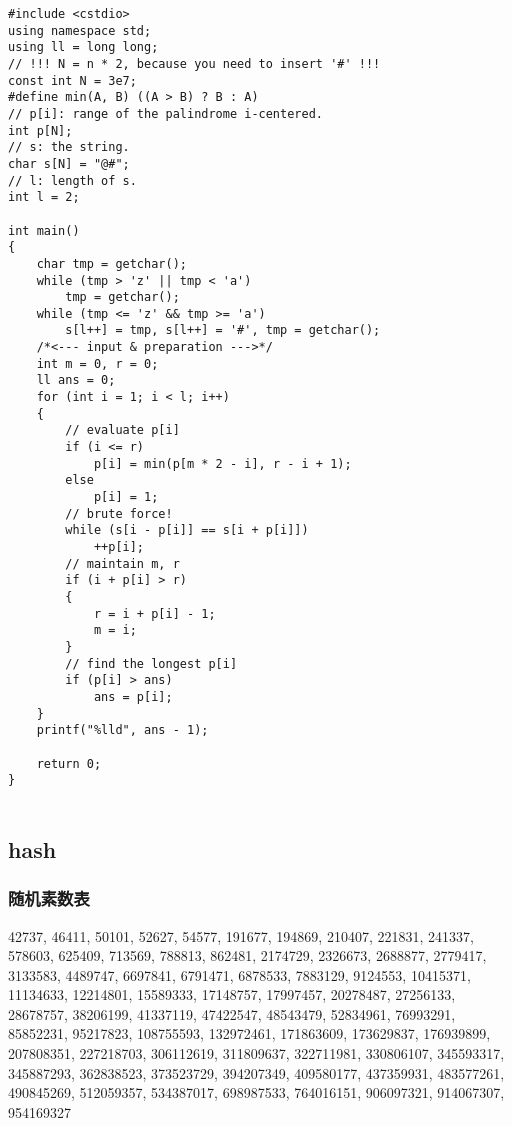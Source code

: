 \documentclass[]{article}
\begin{document}
\begin{verbatim}
#include <cstdio>
using namespace std;
using ll = long long;
// !!! N = n * 2, because you need to insert '#' !!!
const int N = 3e7;
#define min(A, B) ((A > B) ? B : A)
// p[i]: range of the palindrome i-centered. 
int p[N];
// s: the string.
char s[N] = "@#";
// l: length of s.
int l = 2;

int main()
{
    char tmp = getchar();
    while (tmp > 'z' || tmp < 'a')
        tmp = getchar();
    while (tmp <= 'z' && tmp >= 'a')
        s[l++] = tmp, s[l++] = '#', tmp = getchar();
    /*<--- input & preparation --->*/
    int m = 0, r = 0;
    ll ans = 0;
    for (int i = 1; i < l; i++)
    {
        // evaluate p[i]
        if (i <= r)
            p[i] = min(p[m * 2 - i], r - i + 1);
        else
            p[i] = 1;
        // brute force!
        while (s[i - p[i]] == s[i + p[i]])
            ++p[i];
        // maintain m, r
        if (i + p[i] > r)
        {
            r = i + p[i] - 1;
            m = i;
        }
        // find the longest p[i]
        if (p[i] > ans)
            ans = p[i]; 
    }
    printf("%lld", ans - 1);

    return 0;
}
    
\end{verbatim}

\hypertarget{hash}{%
\subsection{hash}\label{hash}}

\hypertarget{ux968fux673aux7d20ux6570ux8868}{%
\subsubsection{随机素数表}\label{ux968fux673aux7d20ux6570ux8868}}

42737, 46411, 50101, 52627, 54577, 191677, 194869, 210407, 221831,
241337, 578603, 625409, 713569, 788813, 862481, 2174729, 2326673,
2688877, 2779417, 3133583, 4489747, 6697841, 6791471, 6878533, 7883129,
9124553, 10415371, 11134633, 12214801, 15589333, 17148757, 17997457,
20278487, 27256133, 28678757, 38206199, 41337119, 47422547, 48543479,
52834961, 76993291, 85852231, 95217823, 108755593, 132972461, 171863609,
173629837, 176939899, 207808351, 227218703, 306112619, 311809637,
322711981, 330806107, 345593317, 345887293, 362838523, 373523729,
394207349, 409580177, 437359931, 483577261, 490845269, 512059357,
534387017, 698987533, 764016151, 906097321, 914067307, 954169327
\end{document}
